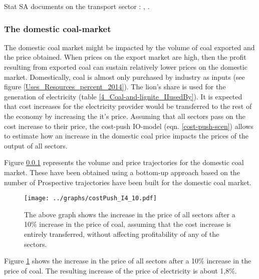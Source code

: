 \documentclass[12pt,english]{article}
\begin{document}

Stat SA documents on the transport sector : \citep{LandTransp2014}, \citep{P7000_2013}.

\subsubsection{The domestic coal-market}


The domestic coal market might be impacted by the volume of coal exported and the price obtained. When prices on the export market are high, then the profit resulting from exported coal can sustain relatively lower prices on the domestic market. Domestically, coal is almost only purchased by industry as inputs (see figure \ref{Uses_Resources_percent_2014}). The lion's share is used for the generation of electricity (table \ref{4_Coal-and-lignite_IIusedBy}). It is expected that cost increases for the electricity provider would be transferred to the rest of the economy by increasing the it's price. Assuming that all sectors pass on the cost increase to their price, the cost-push IO-model (eqn. \ref{cost-push-scen}) allows to estimate how an increase in the domestic coal price impacts the prices of the output of all sectors. 

Figure \ref{} represents the volume and price trajectories for the domestic coal market. These have been obtained using a bottom-up approach based on the number of 
Prospective trajectories have been built for the domestic coal market. 


\begin{figure}[!h]
	\hspace{-10pt}\texttt{[image: ../graphs/costPush\_I4\_10.pdf]}
	\caption{\label{costPush_I4_10} The above graph shows the increase in the price of all sectors after a 10\% increase in the price of coal, assuming that the cost increase is entirely transferred, without affecting profitability of any of the sectors.}
\end{figure}


Figure \ref{costPush_I4_10} shows the increase in the price of all sectors after a 10\% increase in the price of coal. The resulting increase of the price of electricity is about 1,8\%.
\end{document}

